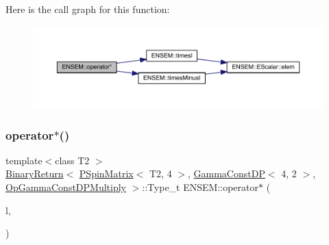 Here is the call graph for this function\+:\nopagebreak
\begin{figure}[H]
\begin{center}
\leavevmode
\includegraphics[width=350pt]{d6/df5/group__primspinmatrix_gae75fd887b0fbf22c05f8739b68d7428c_cgraph}
\end{center}
\end{figure}
\mbox{\label{group__primspinmatrix_ga6c042cd1d538338f171e9e0b588b7b8e}} 
\subsubsection{\texorpdfstring{operator$\ast$()}{operator*()}\hspace{0.1cm}{\footnotesize\ttfamily [51/64]}}
{\footnotesize\ttfamily template$<$class T2 $>$ \\
\mbox{\hyperlink{structENSEM_1_1BinaryReturn}{Binary\+Return}}$<$ \mbox{\hyperlink{classENSEM_1_1PSpinMatrix}{P\+Spin\+Matrix}}$<$ T2, 4 $>$, \mbox{\hyperlink{classENSEM_1_1GammaConstDP}{Gamma\+Const\+DP}}$<$ 4, 2 $>$, \mbox{\hyperlink{structENSEM_1_1OpGammaConstDPMultiply}{Op\+Gamma\+Const\+D\+P\+Multiply}} $>$\+::Type\+\_\+t E\+N\+S\+E\+M\+::operator$\ast$ (\begin{DoxyParamCaption}\item[{const \mbox{\hyperlink{classENSEM_1_1PSpinMatrix}{P\+Spin\+Matrix}}$<$ T2, 4 $>$ \&}]{l,  }\item[{const \mbox{\hyperlink{classENSEM_1_1GammaConstDP}{Gamma\+Const\+DP}}$<$ 4, 2 $>$ \&}]{ }\end{DoxyParamCaption})\hspace{0.3cm}{\ttfamily [inline]}}

\mbox{\label{group__primspinmatrix_ga7049c9a95590816eb50f8755c19aac7e}} 
